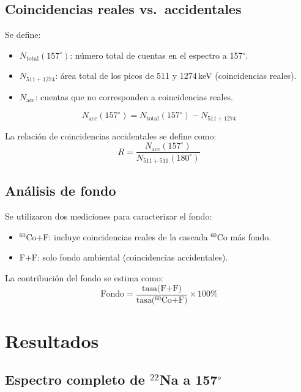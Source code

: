 \documentclass[12pt,a4paper]{article}
\begin{document}
\subsection{Coincidencias reales vs.\ accidentales}

Se define:
\begin{itemize}
  \item $N_{\text{total}}(157^\circ)$: n\'umero total de cuentas en el espectro a 157$^\circ$.
  \item $N_{511+1274}$: \'area total de los picos de 511 y 1274\,keV (coincidencias reales).
  \item $N_{\text{acc}}$: cuentas que no corresponden a coincidencias reales.
\end{itemize}
\begin{equation}
N_{\text{acc}}(157^\circ) = N_{\text{total}}(157^\circ) - N_{511+1274}
\end{equation}

La relaci\'on de coincidencias accidentales se define como:
\begin{equation}
R = \frac{N_{\text{acc}}(157^\circ)}{N_{511+511}(180^\circ)}
\end{equation}

\subsection{An\'alisis de fondo}

Se utilizaron dos mediciones para caracterizar el fondo:
\begin{itemize}
  \item $^{60}$Co+F: incluye coincidencias reales de la cascada $^{60}$Co m\'as fondo.
  \item F+F: solo fondo ambiental (coincidencias accidentales).
\end{itemize}
La contribuci\'on del fondo se estima como:
\begin{equation}
\text{Fondo} = \frac{\text{tasa(F+F)}}{\text{tasa($^{60}$Co+F)}} \times 100\%
\end{equation}

\section{Resultados}

\subsection{Espectro completo de $^{22}$Na a 157$^\circ$}
\end{document}
